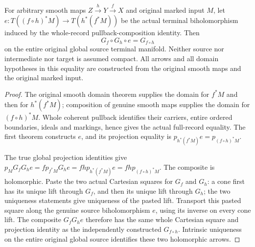 \begin{theorem}
\label{hir:original-arbitrary-target-global-smooth-arrow-composition}
\leanok
For arbitrary smooth maps $Z\xrightarrow{h}Y\xrightarrow{f}X$ and original
marked input $M$, let $e:T((f\circ h)^*M)\to T(h^*(f^*M))$ be the actual
terminal biholomorphism induced by the whole-record pullback-composition
identity. Then
\[
 G_f\circ G_h\circ e=G_{f\circ h}
\]
on the entire original global source terminal manifold. Neither source nor
intermediate nor target is assumed compact. All arrows and all domain
hypotheses in this equality are constructed from the original smooth maps and
the original marked input.
\end{theorem}
\begin{proof}
The original smooth domain theorem supplies the domain for $f^*M$ and then
for $h^*(f^*M)$; composition of genuine smooth maps supplies the domain for
$(f\circ h)^*M$. Whole coherent pullback identifies their carriers, entire
ordered boundaries, ideals and markings, hence gives the actual full-record
equality. The first theorem constructs $e$, and its projection equality is
$p_{h^*(f^*M)}e=p_{(f\circ h)^*M}$.

The true global projection identities give
$p_M G_fG_he=f p_{f^*M}G_he=fh p_{h^*(f^*M)}e=fh
p_{(f\circ h)^*M}$. The composite is holomorphic. Paste the two actual
Cartesian squares for $G_f$ and $G_h$: a cone first has its unique lift through
$G_f$, and then its unique lift through $G_h$; the two uniqueness statements
give uniqueness of the pasted lift. Transport this pasted square along the
genuine source biholomorphism $e$, using its inverse on every cone lift.
The composite $G_fG_he$ therefore has the same whole Cartesian square and
projection identity as the independently constructed $G_{f\circ h}$.
Intrinsic uniqueness on the entire original global source identifies these
two holomorphic arrows.
\end{proof}

